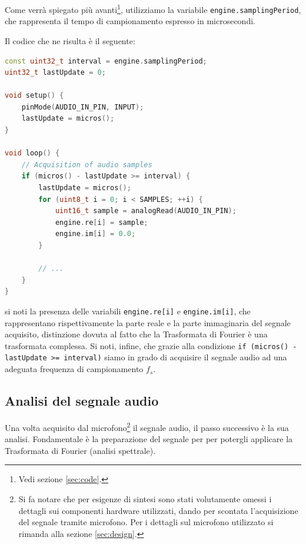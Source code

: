 \documentclass[a4paper,12pt]{report}  %
\newcommand{\lstinlinebg}[1]{\colorbox{backcolour}{\lstinline|#1|}}
\begin{document}
Come verrà spiegato più avanti\footnote{Vedi sezione \ref{sec:code}.}, utilizziamo la variabile \lstinlinebg{engine.samplingPeriod}, che rappresenta il tempo di campionamento espresso in microsecondi.

Il codice che ne risulta è il seguente:

\begin{lstlisting}[language=C++,keywords={const, uint8_t, if, for, void, Serial, begin, uint16_t, analogRead, println, uint32_t, micros, pinMode, INPUT}]
const uint32_t interval = engine.samplingPeriod;
uint32_t lastUpdate = 0;

void setup() {
    pinMode(AUDIO_IN_PIN, INPUT);
    lastUpdate = micros();
}

void loop() {
    // Acquisition of audio samples
    if (micros() - lastUpdate >= interval) {
        lastUpdate = micros();
        for (uint8_t i = 0; i < SAMPLES; ++i) {
            uint16_t sample = analogRead(AUDIO_IN_PIN);
            engine.re[i] = sample;
            engine.im[i] = 0.0;
        }

        // ...
    }
}
\end{lstlisting}

si noti la presenza delle variabili \lstinlinebg{engine.re[i]} e \lstinlinebg{engine.im[i]}, che rappresentano rispettivamente la parte reale e la parte immaginaria del segnale acquisito, distinzione dovuta al fatto che la Trasformata di Fourier è una trasformata complessa.
Si noti, infine, che grazie alla condizione \lstinlinebg{if (micros() - lastUpdate >= interval)} siamo in grado di acquisire il segnale audio ad una adeguata frequenza di campionamento $f_s$.

\subsection{Analisi del segnale audio}
Una volta acquisito dal microfono\footnote{Si fa notare che per esigenze di sintesi sono stati volutamente omessi i dettagli sui componenti hardware utilizzati, dando per scontata l'acquisizione del segnale tramite microfono. Per i dettagli sul microfono utilizzato si rimanda alla sezione \ref{sec:design}.} il segnale audio, il passo successivo è la sua analisi.
Fondamentale è la preparazione del segnale per per potergli applicare la Trasformata di Fourier (analisi spettrale).
\end{document}
